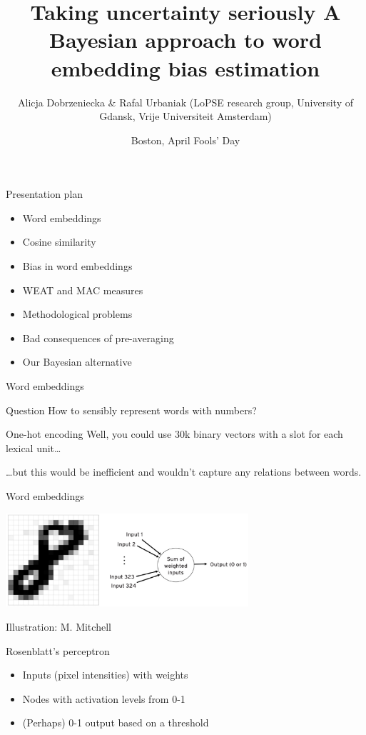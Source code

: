 \documentclass[
  10pt,
  ignorenonframetext,
  x11names, dvipsnames, bibspacing,natbib, table]{beamer}
\title{\Large Taking uncertainty seriously \newline \normalsize A
Bayesian approach to word embedding bias estimation}
\author{Alicja Dobrzeniecka \& Rafal Urbaniak
\footnotesize \newline (LoPSE research group, University of Gdansk,
Vrije Universiteit Amsterdam)}
\date{Boston, April Fools' Day}
\providecommand{\tightlist}{%
  \setlength{\itemsep}{0pt}\setlength{\parskip}{0pt}}
\begin{document}
\frame{\titlepage}

\begin{frame}{Presentation plan}
\protect\hypertarget{presentation-plan}{}
\begin{itemize}
\tightlist
\item
  Word embeddings
\item
  Cosine similarity
\item
  Bias in word embeddings
\item
  WEAT and MAC measures
\item
  Methodological problems
\item
  Bad consequences of pre-averaging
\item
  Our Bayesian alternative
\end{itemize}
\end{frame}

\begin{frame}{Word embeddings}
\protect\hypertarget{word-embeddings}{}
\begin{block}{Question}
\protect\hypertarget{question}{}
How to sensibly represent words with numbers?

\pause
\end{block}

\begin{block}{One-hot encoding}
\protect\hypertarget{one-hot-encoding}{}
Well, you could use 30k binary vectors with a slot for each lexical
unit\dots

\pause

\dots but this would be inefficient and wouldn't capture any relations
between words.
\end{block}
\end{frame}

\begin{frame}{Word embeddings}
\protect\hypertarget{word-embeddings-1}{}
\begin{center}
 \includegraphics[width = 9cm]{images/perceptron1.png}
\end{center}

\vspace{-3mm}

\tiny \hfill \color{gray}Illustration: M. Mitchell \color{black}

\footnotesize

\begin{block}{Rosenblatt's perceptron}
\begin{itemize}
\item Inputs (pixel intensities) with weights
\item Nodes with activation levels from 0-1
\item (Perhaps) 0-1 output based on a threshold
\end{itemize}
\end{block}
\end{frame}
\end{document}

